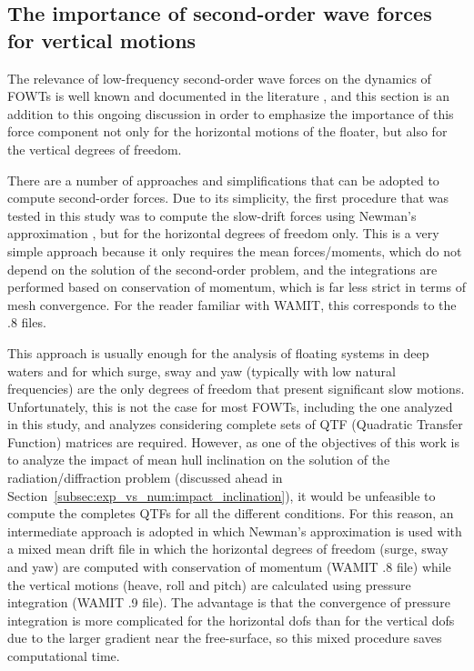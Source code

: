 \subsection{The importance of second-order wave forces for vertical motions} \label{subsec:exp_vs_num:2nd_order}
The relevance of low-frequency second-order wave forces on the dynamics of FOWTs is well known and documented in the literature \citep{coulling2013, gueydon2014, lopez2015, OC52017, simos2018slow}, and this section is an addition to this ongoing discussion in order to emphasize the importance of this force component not only for the horizontal motions of the floater, but also for the vertical degrees of freedom.

There are a number of approaches and simplifications that can be adopted to compute second-order forces. Due to its simplicity, the first procedure that was tested in this study was to compute the slow-drift forces using Newman's approximation \citep{newman1974}, but for the horizontal degrees of freedom only. This is a very simple approach because it only requires the mean forces/moments, which do not depend on the solution of the second-order problem, and the integrations are performed based on conservation of momentum, which is far less strict in terms of mesh convergence. For the reader familiar with WAMIT, this corresponds to the .8 files.

This approach is usually enough for the analysis of floating systems in deep waters and for which surge, sway and yaw (typically with low natural frequencies) are the only degrees of freedom that present significant slow motions. Unfortunately, this is not the case for most FOWTs, including the one analyzed in this study, and analyzes considering complete sets of QTF (Quadratic Transfer Function) matrices are required. However, as one of the objectives of this work is to analyze the impact of mean hull inclination on the solution of the radiation/diffraction problem (discussed ahead in Section~\ref{subsec:exp_vs_num:impact_inclination}), it would be unfeasible to compute the completes QTFs for all the different conditions. For this reason, an intermediate approach is adopted in which Newman's approximation is used with a mixed mean drift file in which the horizontal degrees of freedom (surge, sway and yaw) are computed with conservation of momentum (WAMIT .8 file) while the vertical motions (heave, roll and pitch) are calculated using pressure integration (WAMIT .9 file). The advantage is that the convergence of pressure integration is more complicated for the horizontal dofs than for the vertical dofs due to the larger gradient near the free-surface, so this mixed procedure saves computational time.

